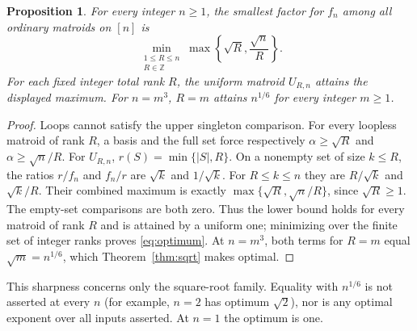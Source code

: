 \documentclass[11pt]{article}
\newtheorem{proposition}[theorem]{Proposition}
\begin{document}
\begin{proposition}\label{prop:optimum}
For every integer $n\ge1$, the smallest factor for $f_n$ among all ordinary matroids on $[n]$ is
\begin{equation}\label{eq:optimum}
 \min_{\substack{1\le R\le n\\R\in\mathbb Z}}
 \max\left\{\sqrt R,\frac{\sqrt n}{R}\right\}.
\end{equation}
For each fixed integer total rank $R$, the uniform matroid $U_{R,n}$ attains the displayed maximum. For $n=m^3$, $R=m$ attains $n^{1/6}$ for every integer $m\ge1$.
\end{proposition}
\begin{proof}
Loops cannot satisfy the upper singleton comparison. For every loopless matroid of rank $R$, a basis and the full set force respectively $\alpha\ge\sqrt R$ and $\alpha\ge\sqrt n/R$.
For $U_{R,n}$, $r(S)=\min\{|S|,R\}$. On a nonempty set of size $k\le R$, the ratios $r/f_n$ and $f_n/r$ are $\sqrt k$ and $1/\sqrt k$. For $R\le k\le n$ they are $R/\sqrt k$ and $\sqrt k/R$. Their combined maximum is exactly $\max\{\sqrt R,\sqrt n/R\}$, since $\sqrt R\ge1$. The empty-set comparisons are both zero. Thus the lower bound holds for every matroid of rank $R$ and is attained by a uniform one; minimizing over the finite set of integer ranks proves \eqref{eq:optimum}. At $n=m^3$, both terms for $R=m$ equal $\sqrt m=n^{1/6}$, which Theorem~\ref{thm:sqrt} makes optimal.
\end{proof}
This sharpness concerns only the square-root family. Equality with $n^{1/6}$ is not asserted at every $n$ (for example, $n=2$ has optimum $\sqrt2$), nor is any optimal exponent over all inputs asserted. At $n=1$ the optimum is one.
\end{document}
